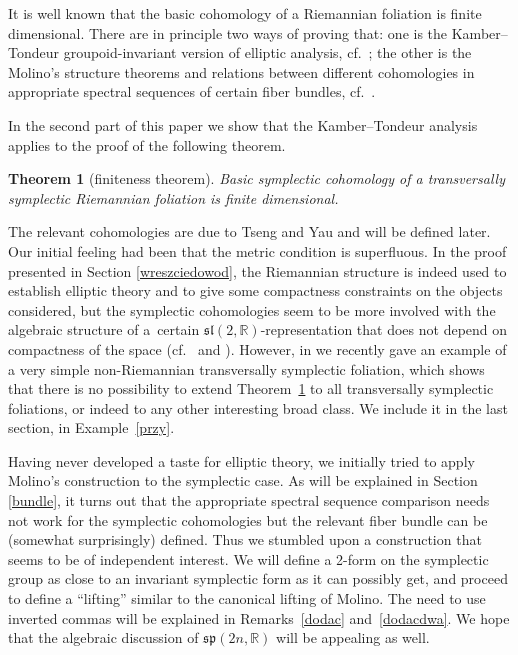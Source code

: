 \documentclass[pdftex]{sigma}
\numberwithin{equation}{section}
\newtheorem{Theorem}{Theorem}[section]
{ \theoremstyle{definition}
\newtheorem{Definition}[Theorem]{Definition}
\newtheorem{Example}[Theorem]{Example}
\newtheorem{Remark}[Theorem]{Remark} }
\begin{document}
It is well known that the basic cohomology of a Riemannian foliation is finite dimensional. There are in principle two ways of proving that: one is the Kamber--Tondeur groupoid-invariant version of elliptic analysis, cf.~\cite{azizeliptyczny}; the other is the Molino's structure theorems and relations between different cohomologies in appropriate spectral sequences of certain fiber bundles, cf.~\cite{aziztopologiczny}.

In the second part of this paper we show that the Kamber--Tondeur analysis applies to the proof of the following theorem.

\begin{Theorem}[finiteness theorem] \label{main} Basic symplectic cohomology of a transversally symplectic Riemannian foliation is finite dimensional.
\end{Theorem}

The relevant cohomologies are due to Tseng and Yau and will be defined later. Our initial feeling had been that the metric condition is superfluous. In the proof presented in Section \ref{wreszciedowod}, the Riemannian structure is indeed used to establish elliptic theory and to give some compactness constraints on the objects considered, but the symplectic cohomologies seem to be more involved with the algebraic structure of a~certain $\mathfrak{sl}(2,\mathbb{R})$-representation that does not depend on compactness of the space (cf.~\cite{yan} and \cite[Section~3.2.1]{tseng}). However, in \cite{pawelija} we recently gave an example of a very simple non-Riemannian transversally symplectic foliation, which shows that there is no possibility to extend Theorem~\ref{main} to all transversally symplectic foliations, or indeed to any other interesting broad class. We include it in the last section, in Example~\ref{przy}.

 Having never developed a taste for elliptic theory, we initially tried to apply Molino's construction to the symplectic case. As will be explained in Section \ref{bundle}, it turns out that the appropriate spectral sequence comparison needs not work for the symplectic cohomologies but the relevant fiber bundle can be (somewhat surprisingly) defined. Thus we stumbled upon a construction that seems to be of independent interest. We will define a 2-form on the symplectic group as close to an invariant symplectic form as it can possibly get, and proceed to define a ``lifting'' similar to the canonical lifting of Molino. The need to use inverted commas will be explained in Remarks~\ref{dodac} and~\ref{dodacdwa}. We hope that the algebraic discussion of $\mathfrak{sp}(2n,\mathbb{R})$ will be appealing as well.
\end{document}
